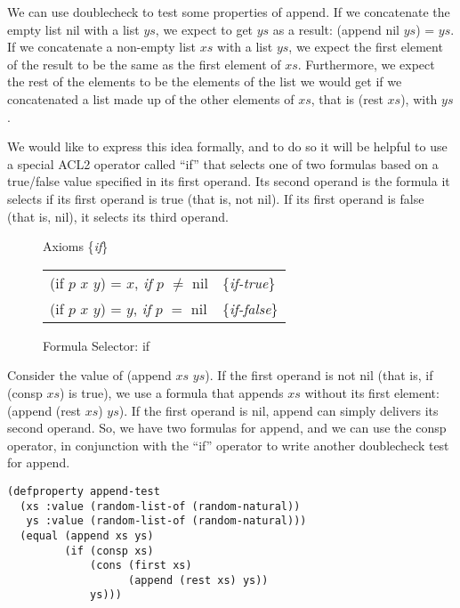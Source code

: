We can use doublecheck to test some properties of append.
If we concatenate the empty list nil with a list $ys$,
we expect to get $ys$ as a result: (append nil $ys$) = $ys$.
If we concatenate a non-empty list $xs$ with a list $ys$,
we expect the first element of the result to be the same as
the first element of $xs$.
Furthermore, we expect the rest of the elements to be
the elements of the list we would get if we concatenated
a list made up of the other elements of $xs$, that is (rest $xs$),
with $ys$.

We would like to express this idea formally,
and to do so it will be helpful to use a special ACL2 operator
called ``if''
that selects one of two formulas based on a true/false
value specified in its first operand.
Its second operand is the formula it selects if
its first operand is true (that is, not nil).
If its first operand is false (that is, nil),
it selects its third operand.

\begin{figure}
\begin{center}
Axioms \{\emph{if}\} \\
\begin{tabular}{ll}
(if $p$ $x$ $y$) = $x$, \emph{if} $p$ $\neq$ nil  & \{\emph{if-true}\}  \\
(if $p$ $x$ $y$) = $y$, \emph{if} $p$ $=$ nil     & \{\emph{if-false}\} \\
\end{tabular}
\end{center}
\caption{Formula Selector: if}
\label{fig:if-axioms}
\end{figure}

Consider the value of (append $xs$ $ys$).
If the first operand is not nil (that is, if (consp $xs$) is true),
we use a formula that appends $xs$ without its first element: (append (rest $xs$) $ys$).
If the first operand is nil, append can simply delivers its second operand.
So, we have two formulas for append, and we can use the consp operator,
in conjunction with the ``if'' operator
to write another doublecheck test for append.

\begin{samepage}
\begin{Verbatim}
(defproperty append-test
  (xs :value (random-list-of (random-natural))
   ys :value (random-list-of (random-natural)))
  (equal (append xs ys)
         (if (consp xs)
             (cons (first xs)
                   (append (rest xs) ys))
             ys)))
\end{Verbatim}
\end{samepage}

